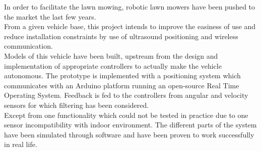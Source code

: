 In order to facilitate the lawn mowing, robotic lawn mowers have been pushed to the market the last few years.\\
From a given vehicle base, this project intends to improve the easiness of use and reduce installation constraints by use of ultrasound positioning and wireless communication.\\
Models of this vehicle have been built, upstream from the design and implementation of appropriate controllers to actually make the vehicle autonomous. The prototype is implemented with a positioning system which communicates with an Arduino platform running an open-source Real Time Operating System. Feedback is fed to the controllers from angular and velocity sensors for which filtering has been considered.\\
Except from one functionality which could not be tested in practice due to one sensor incompatibility with indoor environment. The different parts of the system have been simulated through software and have been proven to work successfully in real life.
